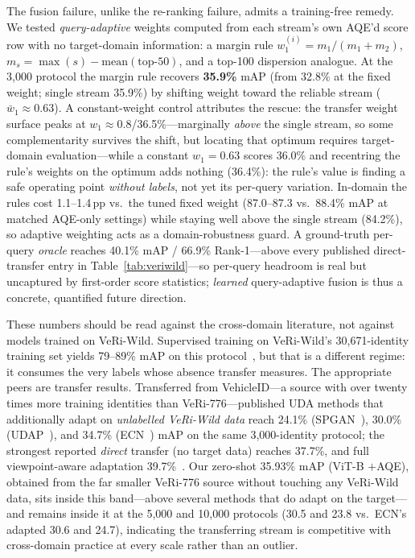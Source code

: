 \documentclass[10pt,a4paper]{article}
\begin{document}
The fusion failure, unlike the re-ranking failure, admits a training-free
remedy. We tested \emph{query-adaptive} weights computed from each stream's own
AQE'd score row with no target-domain information: a margin rule
$w_1^{(i)}{=}m_1/(m_1{+}m_2)$, $m_s{=}\max(s)-\mathrm{mean}(\text{top-}50)$,
and a top-100 dispersion analogue. At the 3{,}000 protocol the margin rule
recovers \textbf{35.9\%} mAP (from 32.8\% at the fixed weight; single stream
35.9\%) by shifting weight toward the reliable stream
($\bar{w}_1{\approx}0.63$). A constant-weight control attributes the rescue:
the transfer weight surface peaks at $w_1{\approx}0.8$/36.5\%---marginally
\emph{above} the single stream, so some complementarity survives the shift, but
locating that optimum requires target-domain evaluation---while a constant
$w_1{=}0.63$ scores 36.0\% and recentring the rule's weights on the optimum
adds nothing (36.4\%): the rule's value is finding a safe operating point
\emph{without labels}, not yet its per-query variation. In-domain the rules
cost 1.1--1.4\,pp vs.\ the tuned fixed weight (87.0--87.3 vs.\ 88.4\% mAP at
matched AQE-only settings) while staying well above the single stream
(84.2\%), so adaptive weighting acts as a domain-robustness guard. A
ground-truth per-query \emph{oracle} reaches 40.1\% mAP / 66.9\%
Rank-1---above every published direct-transfer entry in
Table~\ref{tab:veriwild}---so per-query headroom is real but uncaptured by
first-order score statistics; \emph{learned} query-adaptive fusion is thus a
concrete, quantified future direction.

These numbers should be read against the cross-domain literature, not against
models trained on VeRi-Wild. Supervised training on VeRi-Wild's
30{,}671-identity training set yields 79--89\% mAP on this
protocol~\cite{lou2019veriwild,lu2025clipsenet,benmabrouk2026genlimits}, but
that is a different regime: it consumes the very labels whose absence transfer
measures. The appropriate peers are transfer results. Transferred from
VehicleID---a source with over twenty times more training identities than
VeRi-776---published UDA methods that additionally adapt on \emph{unlabelled
VeRi-Wild data} reach 24.1\% (SPGAN~\cite{deng2018spgan}), 30.0\%
(UDAP~\cite{song2020udap}), and 34.7\% (ECN~\cite{zhong2019ecn}) mAP on the
same 3{,}000-identity protocol; the strongest reported \emph{direct} transfer
(no target data) reaches 37.7\%, and full viewpoint-aware adaptation
39.7\%~\cite{zheng2020vapc}. Our zero-shot 35.93\% mAP (ViT-B $+$AQE), obtained
from the far smaller VeRi-776 source without touching any VeRi-Wild data, sits
inside this band---above several methods that do adapt on the target---and
remains inside it at the 5{,}000 and 10{,}000 protocols (30.5 and 23.8 vs.\
ECN's adapted 30.6 and 24.7), indicating the transferring stream is competitive
with cross-domain practice at every scale rather than an outlier.
\end{document}
